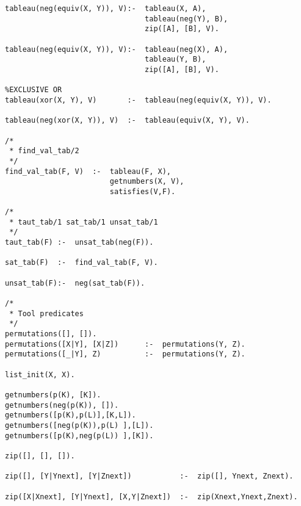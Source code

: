\documentclass[a4paper,10pt]{article}
\begin{document}
\begin{lstlisting}
tableau(neg(equiv(X, Y)), V):-	tableau(X, A),
								tableau(neg(Y), B),
								zip([A], [B], V).

tableau(neg(equiv(X, Y)), V):-	tableau(neg(X), A),
								tableau(Y, B),
								zip([A], [B], V).

%EXCLUSIVE OR
tableau(xor(X, Y), V)		:-	tableau(neg(equiv(X, Y)), V).

tableau(neg(xor(X, Y)), V)	:-	tableau(equiv(X, Y), V).

/*
 * find_val_tab/2
 */
find_val_tab(F, V)	:-	tableau(F, X),
						getnumbers(X, V),
						satisfies(V,F).

/*
 * taut_tab/1 sat_tab/1 unsat_tab/1
 */
taut_tab(F)	:-	unsat_tab(neg(F)).

sat_tab(F)	:-	find_val_tab(F, V).

unsat_tab(F):-	neg(sat_tab(F)).

/*
 * Tool predicates
 */
permutations([], []).
permutations([X|Y], [X|Z])		:-	permutations(Y, Z).
permutations([_|Y], Z)			:-	permutations(Y, Z).

list_init(X, X).

getnumbers(p(K), [K]).
getnumbers(neg(p(K)), []).
getnumbers([p(K),p(L)],[K,L]).
getnumbers([neg(p(K)),p(L) ],[L]).
getnumbers([p(K),neg(p(L)) ],[K]).

zip([], [], []).

zip([], [Y|Ynext], [Y|Znext])			:-	zip([], Ynext, Znext).

zip([X|Xnext], [Y|Ynext], [X,Y|Znext])	:-	zip(Xnext,Ynext,Znext).
\end{lstlisting}
\end{document}
